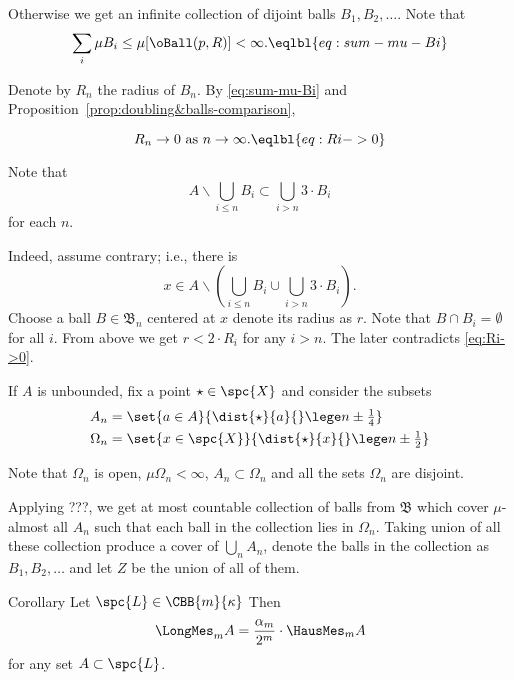 Otherwise we get an infinite collection of dijoint balls
$B_1,B_2,\dots$.
Note that 
\[\sum_i\mu B_i
\le 
\mu [\oBall(p,R)]<\infty.
\eqlbl{eq:sum-mu-Bi}\]

Denote by $R_n$ the radius of $B_n$.
By \ref{eq:sum-mu-Bi} and Proposition~\ref{prop:doubling&balls-comparison},

\[R_n\to 0\ \text{as}\ n\to\infty.
\eqlbl{eq:Ri->0}\]

\begin{clm}{}
Note that
\[A\backslash 
\bigcup_{i\le n}B_i
\subset 
\bigcup_{i>n}3\cdot B_i\]
for each $n$.
\end{clm}

Indeed, assume contrary; i.e., there is 
\[x\in A\backslash 
\left(\bigcup_{i\le n}B_i\cup \bigcup_{i> n}3\cdot B_i\right).\]
Choose a ball $B\in\mathfrak{B}_n$ centered  at $x$
denote its radius as $r$.
Note that $B\cap B_i=\emptyset$ for all $i$.
From above we get $r<2\cdot R_i$ for any $i>n$.
The later contradicts \ref{eq:Ri->0}.

If $A$ is unbounded, fix a point $\star\in\spc{X}$ and consider the subsets 
\begin{align*}
A_n&=\set{a\in A}{\dist{\star}{a}{}\lege n\pm \tfrac14}
\\
\Omega_n&=\set{x\in \spc{X}}{\dist{\star}{x}{}\lege n\pm \tfrac12}
\end{align*}

Note that $\Omega_n$ is open,
$\mu\Omega_n<\infty$,
$A_n\subset \Omega_n$
and all the sets $\Omega_n$ are disjoint.

Applying ???, we get at most countable collection 
of balls from $\mathfrak{B}$ which cover $\mu$-almost all $A_n$ such that each ball in the collection lies in $\Omega_n$.
Taking union of all these collection produce a cover of $\bigcup_n A_n$,
denote the balls in the collection as 
$B_1,B_2,\dots$ and let $Z$ be the union of all of them.
\qeds














\begin{thm}{Corollary}\label{cor:meas=CBB}
Let $\spc{L}\in\CBB{m}{\kappa}$
Then 
\[\LongMes_m A
= 
\frac{\alpha_m}{2^m}\cdot\HausMes_m A
\]
for any set $A\subset  \spc{L}$.
\end{thm}

